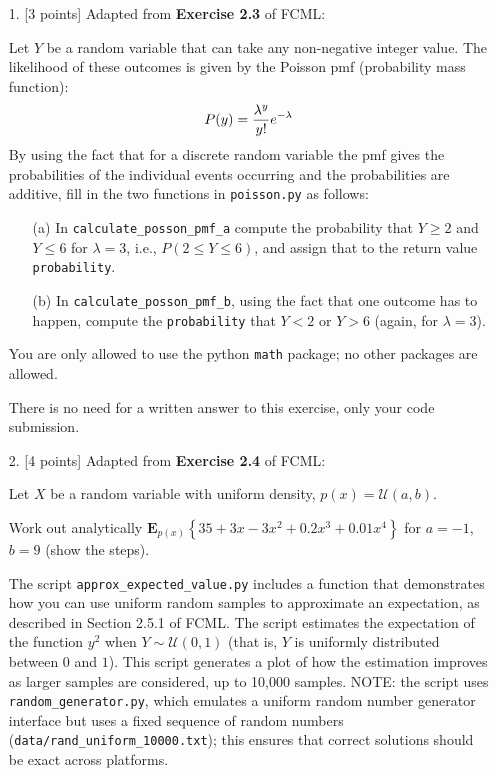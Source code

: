 \documentclass[10pt]{article}
\begin{document}
\begin{itemize}

\item[1.] [3 points]
Adapted from {\bf Exercise 2.3} of FCML:

Let $Y$ be a random variable that can take any non-negative integer value.  The likelihood of these outcomes is given by the Poisson pmf (probability mass function):
\begin{eqnarray}
P(y) = {\lambda^y\over y!} e^{-\lambda}
\end{eqnarray}
By using the fact that for a discrete random variable the pmf gives the probabilities of the individual events occurring and the probabilities are additive, fill in the two functions in {\tt poisson.py} as follows:
\begin{enumerate}
\item[(a)] In {\tt calculate\_posson\_pmf\_a} compute the probability that $Y \geq 2$ and $Y \leq 6$ for $\lambda = 3$, i.e., $P(2 \leq Y \leq 6)$, and assign that to the return value {\tt probability}.
\item[(b)] In {\tt calculate\_posson\_pmf\_b}, using the fact that one outcome has to happen, compute the {\tt probability} that $Y < 2$ or $Y > 6$ (again, for $\lambda = 3$).
\end{enumerate}
You are only allowed to use the python {\tt math} package; no other packages are allowed.

There is no need for a written answer to this exercise, only your code submission.



\item[2.] [4 points]
Adapted from {\bf Exercise 2.4} of FCML:

Let $X$ be a random variable with uniform density, $p(x) = \mathcal{U}(a,b)$.

Work out analytically $\mathbf{E}_{p(x)} \left\{ 35 + 3x - 3x^2 + 0.2x^3 + 0.01x^4 \right\}$ for $a=-1$, $b=9$ (show the steps).  

The script {\tt approx\_expected\_value.py} includes a function that demonstrates how you can use uniform random samples to approximate an expectation, as described in Section 2.5.1 of FCML. The script estimates the expectation of the function $y^2$ when $Y \sim \mathcal{U}(0,1)$ (that is, $Y$ is uniformly distributed between $0$ and $1$). This script generates a plot of how the estimation improves as larger samples are considered, up to 10,000 samples.  NOTE: the script uses {\tt random\_generator.py}, which emulates a uniform random number generator interface but uses a fixed sequence of random numbers ({\tt data/rand\_uniform\_10000.txt}); this ensures that correct solutions should be exact across platforms.


\end{itemize}
\end{document}
